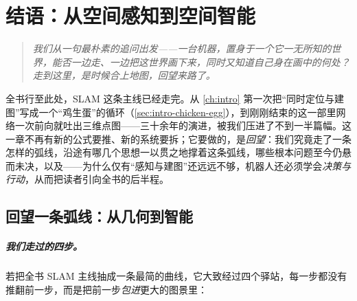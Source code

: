 \chapter{结语：从空间感知到空间智能}
\label{ch:epilogue}


\begin{quote}
\small\itshape
我们从一句最朴素的追问出发——一台机器，置身于一个它一无所知的世界，能否一边走、一边把这世界画下来，同时又知道自己身在画中的何处？走到这里，是时候合上地图，回望来路了。
\end{quote}

\noindent 全书行至此处，SLAM 这条主线已经走完。从 \cref{ch:intro} 第一次把“同时定位与建图”写成一个“鸡生蛋”的循环（\cref{sec:intro-chicken-egg}），到刚刚结束的这一部里网络一次前向就吐出三维点图——三十余年的演进，被我们压进了不到一半篇幅。这一章不再有新的公式要推、新的系统要拆；它要做的，是\emph{回望}：我们究竟走了一条怎样的弧线，沿途有哪几个思想一以贯之地撑着这条弧线，哪些根本问题至今仍悬而未决，以及——为什么仅有“感知与建图”还远远不够，机器人还必须学会\emph{决策与行动}，从而把读者引向全书的后半程。

\section{回望一条弧线：从几何到智能}
\label{sec:epilogue-arc}

\paragraph{我们走过的四步。}
若把全书 SLAM 主线抽成一条最简的曲线，它大致经过四个驿站，每一步都没有推翻前一步，而是把前一步\emph{包进}更大的图景里：

